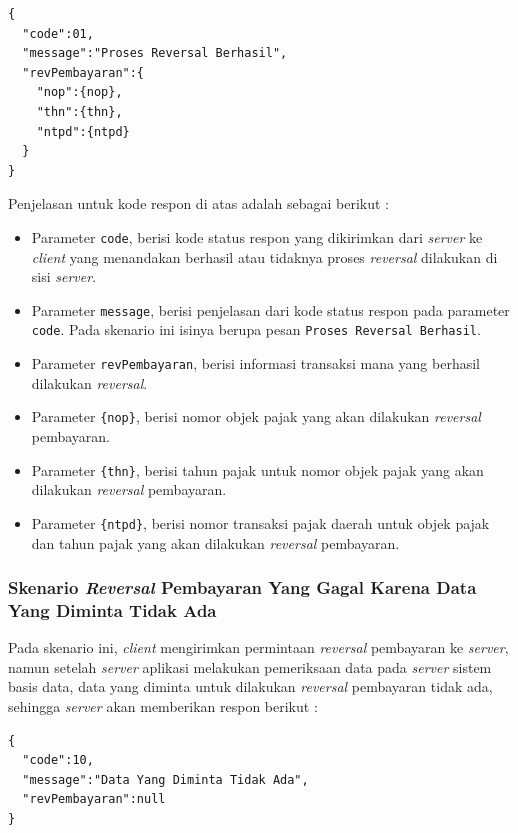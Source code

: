 \documentclass[pdftex,12pt, oneside]{article}
\begin{document}
  \begin{lstlisting}
{
  "code":01,
  "message":"Proses Reversal Berhasil",
  "revPembayaran":{
    "nop":{nop},
    "thn":{thn},
    "ntpd":{ntpd}
  }
}
  \end{lstlisting}
  
  Penjelasan untuk kode respon di atas adalah sebagai berikut :
  
  \begin{itemize}
    \item Parameter \texttt{code}, berisi kode status respon yang dikirimkan dari \textit{server} ke \textit{client} yang menandakan berhasil atau tidaknya proses \textit{reversal} dilakukan di sisi \textit{server}.
    \item Parameter \texttt{message}, berisi penjelasan dari kode status respon pada parameter \texttt{code}. Pada skenario ini isinya berupa pesan \texttt{Proses Reversal Berhasil}.
    \item Parameter \texttt{revPembayaran}, berisi informasi transaksi mana yang berhasil dilakukan \textit{reversal}.
    \item Parameter \texttt{\{nop\}}, berisi nomor objek pajak yang akan dilakukan \textit{reversal} pembayaran.
    \item Parameter \texttt{\{thn\}}, berisi tahun pajak untuk nomor objek pajak yang akan dilakukan \textit{reversal} pembayaran.
    \item Parameter \texttt{\{ntpd\}}, berisi nomor transaksi pajak daerah untuk objek pajak dan tahun pajak yang akan dilakukan \textit{reversal} pembayaran.
  \end{itemize}
  
  \subsubsection{Skenario \textit{Reversal} Pembayaran Yang Gagal Karena Data Yang Diminta Tidak Ada}
  
  Pada skenario ini, \textit{client} mengirimkan permintaan \textit{reversal} pembayaran ke \textit{server}, namun setelah \textit{server} aplikasi melakukan pemeriksaan data pada \textit{server} sistem basis data, data yang diminta untuk dilakukan \textit{reversal} pembayaran tidak ada, sehingga \textit{server} akan memberikan respon berikut :
  
  \begin{lstlisting}
{
  "code":10,
  "message":"Data Yang Diminta Tidak Ada",
  "revPembayaran":null
}
  \end{lstlisting}
  
\end{document}
